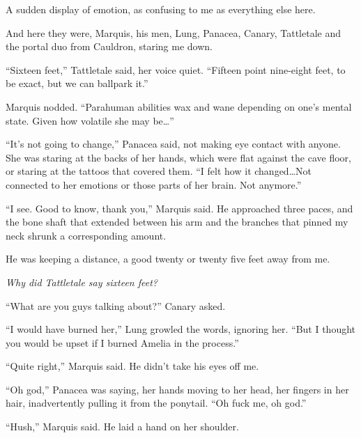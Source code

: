 A sudden display of emotion, as confusing to me as everything else here.



And here they were, Marquis, his men, Lung, Panacea, Canary, Tattletale and the portal duo from Cauldron, staring me down.



``Sixteen feet,'' Tattletale said, her voice quiet.  ``Fifteen point nine-eight feet, to be exact, but we can ballpark it.''



Marquis nodded.  ``Parahuman abilities wax and wane depending on one's mental state.  Given how volatile she may be\ldots''



``It's not going to change,'' Panacea said, not making eye contact with anyone.  She was staring at the backs of her hands, which were flat against the cave floor, or staring at the tattoos that covered them.  ``I felt how it changed\ldots  Not connected to her emotions or those parts of her brain.  Not anymore.''



``I see.  Good to know, thank you,'' Marquis said.  He approached three paces, and the bone shaft that extended between his arm and the branches that pinned my neck shrunk a corresponding amount.



He was keeping a distance, a good twenty or twenty five feet away from me.



\emph{Why did Tattletale say sixteen feet?}



``What are you guys talking about?'' Canary asked.



``I would have burned her,'' Lung growled the words, ignoring her.  ``But I thought you would be upset if I burned Amelia in the process.''



``Quite right,'' Marquis said.  He didn't take his eyes off me.



``Oh god,'' Panacea was saying, her hands moving to her head, her fingers in her hair, inadvertently pulling it from the ponytail.  ``Oh fuck me, oh god.''



``Hush,'' Marquis said.  He laid a hand on her shoulder.



